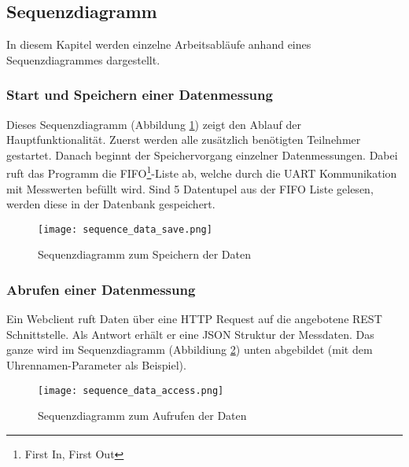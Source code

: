 \subsection{Sequenzdiagramm}
In diesem Kapitel werden einzelne Arbeitsabläufe anhand eines Sequenzdiagrammes dargestellt.
	\subsubsection{Start und Speichern einer Datenmessung}
    Dieses Sequenzdiagramm (Abbildung \ref{fig:sequence_save}) zeigt den Ablauf der Hauptfunktionalität.
    Zuerst werden alle zusätzlich benötigten Teilnehmer gestartet.
    Danach beginnt der Speichervorgang einzelner Datenmessungen.
    Dabei ruft das Programm die FIFO\footnote{First In, First Out}-Liste ab, welche durch die UART Kommunikation mit Messwerten befüllt wird.
    Sind 5 Datentupel aus der FIFO Liste gelesen, werden diese in der Datenbank gespeichert.
    \begin{figure}[H]
        \centering
        \texttt{[image: sequence\_data\_save.png]}
        \caption{Sequenzdiagramm zum Speichern der Daten}
        \label{fig:sequence_save}
    \end{figure}

    \clearpage
    \subsubsection{Abrufen einer Datenmessung}
    Ein Webclient ruft Daten über eine HTTP Request auf die angebotene REST Schnittstelle.
    Als Antwort erhält er eine JSON Struktur der Messdaten.
    Das ganze wird im Sequenzdiagramm (Abbildiung \ref{fig:sequence_get}) unten abgebildet (mit dem Uhrennamen-Parameter als Beispiel).
    \begin{figure}[H]
        \centering
        \texttt{[image: sequence\_data\_access.png]}
        \caption{Sequenzdiagramm zum Aufrufen der Daten}
        \label{fig:sequence_get}
    \end{figure}
